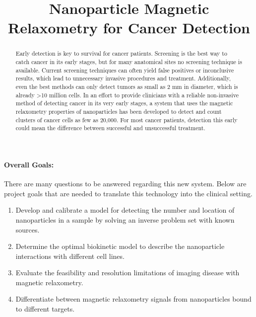 \documentclass{article}         %
\title{Nanoparticle Magnetic Relaxometry for Cancer Detection}
\author{}
\theoremstyle{definition}
\theoremstyle{remark}
\begin{document}
\maketitle
\begin{abstract}                
Early detection is key to survival for cancer patients.  Screening
is the best way to catch cancer in its early stages, but for many anatomical
sites no screening technique is available.  Current screening techniques can
often yield false positives or inconclusive results, which lead to
unnecessary invasive procedures and treatment. Additionally, even the best
methods can only detect tumors as small as 2 mm in diameter, which is
already >10 million cells.  In an effort to provide clinicians with a
reliable non-invasive method of detecting cancer in its very early stages, a
system that uses the magnetic relaxometry properties of nanoparticles has
been developed to detect and count clusters of cancer cells as few as
20,000.  For most cancer patients, detection this early could mean the
difference between successful and unsuccessful treatment.  
\end{abstract}                

\paragraph{Overall Goals:}  
There are many questions to be answered regarding this new system.  Below
are project goals that are needed to translate this technology into the
clinical setting.
\begin{enumerate}
\item	Develop and calibrate a model for detecting the number and location
of nanoparticles in a sample by solving an inverse problem set with known
sources.
\item	Determine the optimal biokinetic model to describe the nanoparticle
interactions with different cell lines.
\item	Evaluate the feasibility and resolution limitations of imaging
disease with magnetic relaxometry.
\item	Differentiate between magnetic relaxometry signals from
nanoparticles bound to different targets.
\end{enumerate}
\end{document}
